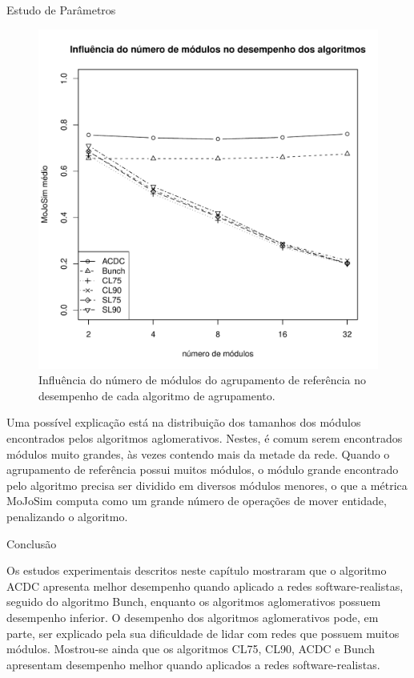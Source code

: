 \begin{section}{Estudo de Parâmetros}
\begin{figure}[htbp]
	\centering
		\includegraphics[scale=0.5]{figuras/mojosim-vs-modules}
	\caption{Influência do número de módulos do agrupamento de referência no desempenho de cada algoritmo de agrupamento.}
	\label{fig:mojosim-vs-modules}
\end{figure}

Uma possível explicação está na distribuição dos tamanhos dos módulos encontrados pelos algoritmos aglomerativos. Nestes, é comum serem encontrados módulos muito grandes, às vezes contendo mais da metade da rede. Quando o agrupamento de referência possui muitos módulos, o módulo grande encontrado pelo algoritmo precisa ser dividido em diversos módulos menores, o que a métrica MoJoSim computa como um grande número de operações de mover entidade, penalizando o algoritmo.


\end{section}

\begin{section}{Conclusão}

Os estudos experimentais descritos neste capítulo mostraram que o algoritmo ACDC apresenta melhor desempenho quando aplicado a redes software-realistas, seguido do algoritmo Bunch, enquanto os algoritmos aglomerativos possuem desempenho inferior. O desempenho dos algoritmos aglomerativos pode, em parte, ser explicado pela sua dificuldade de lidar com redes que possuem muitos módulos. Mostrou-se ainda que os algoritmos CL75, CL90, ACDC e Bunch apresentam desempenho melhor quando aplicados a redes software-realistas.

\end{section}
